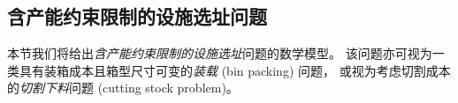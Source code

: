 \subsection{含产能约束限制的设施选址问题}
本节我们将给出\emph{含产能约束限制的设施选址}问题的数学模型。
该问题亦可视为一类具有装箱成本且箱型尺寸可变的\emph{装载} (bin packing) 问题，
或视为考虑切割成本的\emph{切割下料}问题 (cutting stock problem)。

